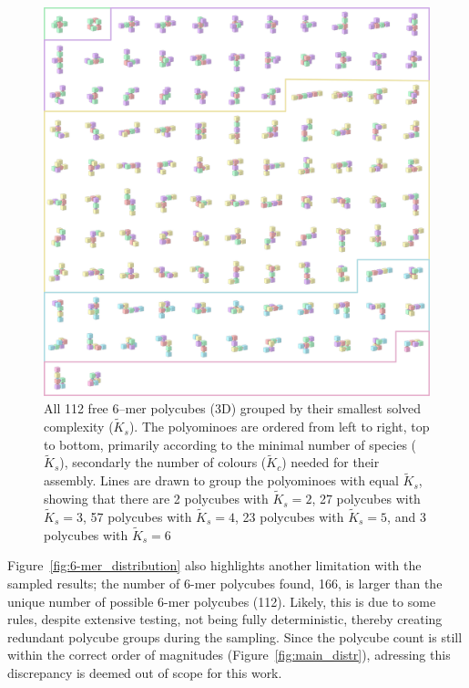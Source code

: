 \begin{figure}[h]
    \centering
    \includegraphics[width=\textwidth,]{figures/6-mers/6-mers.png}
    \caption{All 112 free 6--mer polycubes (3D) grouped by their smallest solved complexity (\(\widetilde{K}_s\)). The polyominoes are ordered from left to right, top to bottom, primarily according to the minimal number of species (\(\widetilde{K}_s\)), secondarly the number of colours (\(\widetilde{K}_c\)) needed for their assembly. Lines are drawn to group the polyominoes with equal \(\widetilde{K}_s\), showing that there are 
    2 polycubes with \(\widetilde{K}_s=2\),
    27 polycubes with \(\widetilde{K}_s=3\),
    57 polycubes with \(\widetilde{K}_s=4\),
    23 polycubes with \(\widetilde{K}_s=5\), and
    3 polycubes with \(\widetilde{K}_s=6\)
    }
    \label{fig:6-mers_grid}
\end{figure}

Figure~\ref{fig:6-mer_distribution} also highlights another limitation with the sampled results; the number of 6-mer polycubes found, 166, is larger than the unique number of possible 6-mer polycubes (112). Likely, this is due to some rules, despite extensive testing, not being fully deterministic, thereby creating redundant polycube groups during the sampling. Since the polycube count is still within the correct order of magnitudes (Figure~\ref{fig:main_distr}), adressing this discrepancy is deemed out of scope for this work.


